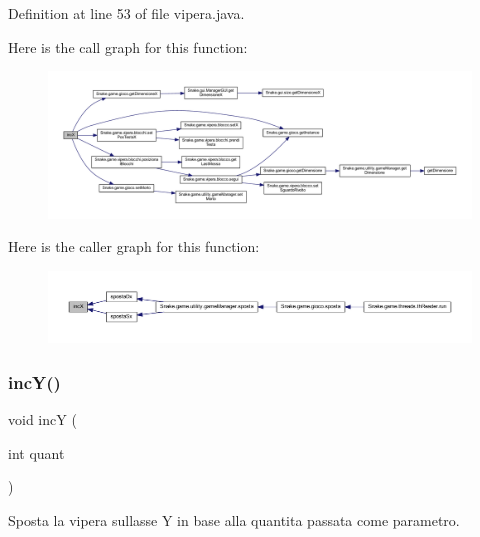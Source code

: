 Definition at line 53 of file vipera.\+java.

Here is the call graph for this function\+:
\nopagebreak
\begin{figure}[H]
\begin{center}
\leavevmode
\includegraphics[width=350pt]{class_snake_1_1game_1_1vipera_1_1vipera_ab776bb3430d4d6d0a27bb94ae74ee07c_cgraph}
\end{center}
\end{figure}
Here is the caller graph for this function\+:
\nopagebreak
\begin{figure}[H]
\begin{center}
\leavevmode
\includegraphics[width=350pt]{class_snake_1_1game_1_1vipera_1_1vipera_ab776bb3430d4d6d0a27bb94ae74ee07c_icgraph}
\end{center}
\end{figure}
\mbox{\label{class_snake_1_1game_1_1vipera_1_1vipera_a51a16845a66091ec0697d9ccf8ba4e8d}} 
\subsubsection{\texorpdfstring{inc\+Y()}{incY()}}
{\footnotesize\ttfamily void incY (\begin{DoxyParamCaption}\item[{int}]{quant }\end{DoxyParamCaption})}



Sposta la vipera sull\textquotesingle{}asse Y in base alla quantita passata come parametro. 


